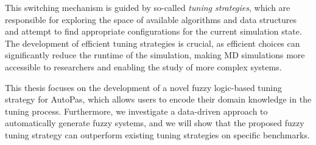 This switching mechanism is guided by so-called \textit{tuning strategies}, which are responsible for exploring the space of available algorithms and data structures and attempt to find appropriate configurations for the current simulation state. The development of efficient tuning strategies is crucial, as efficient choices can significantly reduce the runtime of the simulation, making MD simulations more accessible to researchers and enabling the study of more complex systems.

This thesis focuses on the development of a novel fuzzy logic-based tuning strategy for AutoPas, which allows users to encode their domain knowledge in the tuning process. Furthermore, we investigate a data-driven approach to automatically generate fuzzy systems, and we will show that the proposed fuzzy tuning strategy can outperform existing tuning strategies on specific benchmarks.
